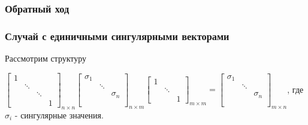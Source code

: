 \subsubsection{Обратный ход}

\subsubsection{Случай с единичными сингулярными векторами}
Рассмотрим структуру

\begin{center}
    $\begin{bmatrix}
        1 & & & \\
         & \ddots & & \\
         & & \ddots & \\
         & & & 1
    \end{bmatrix}_{n \times n}
    \begin{bmatrix}
        \sigma_1 & & \\
         & \ddots & \\
         & & \sigma_n \\
         & & \\
         & & 
    \end{bmatrix}_{n \times m}
    \begin{bmatrix}
        1 & & \\
         & \ddots & \\
         & & 1
    \end{bmatrix}_{m \times m}
    =
    \begin{bmatrix}
        \sigma_1 & & \\
         & \ddots & \\
         & & \sigma_n \\
         & & \\
         & & 
    \end{bmatrix}_{m \times n}$,
    где $\sigma_i$ - сингулярные значения.
\end{center}

